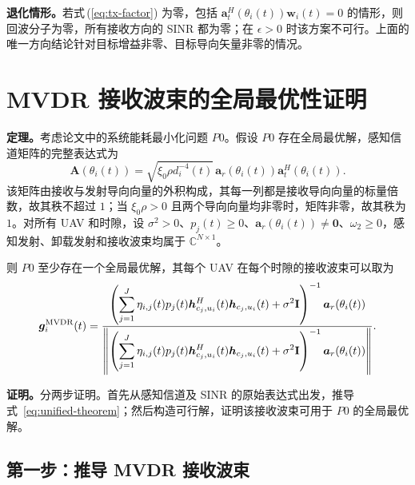 \documentclass[11pt,a4paper]{ctexart}
\begin{document}
\textbf{退化情形。}若式\,(\ref{eq:tx-factor}) 为零，包括 $\bm a_t^H(\theta_i(t))\bm w_i(t)=0$ 的情形，则回波分子为零，所有接收方向的 SINR 都为零；在 $\epsilon>0$ 时该方案不可行。上面的唯一方向结论针对目标增益非零、目标导向矢量非零的情况。

\section{MVDR 接收波束的全局最优性证明}

\noindent\textbf{定理。}考虑论文中的系统能耗最小化问题 $P0$。假设 $P0$ 存在全局最优解，感知信道矩阵的完整表达式为
\begin{equation}\label{eq:theorem-channel}
\mathbf A(\theta_i(t))=\sqrt{\xi_0\rho d_i^{-4}(t)}\,
\bm a_r(\theta_i(t))\bm a_t^H(\theta_i(t)).
\end{equation}
该矩阵由接收与发射导向向量的外积构成，其每一列都是接收导向向量的标量倍数，故其秩不超过 $1$；当 $\xi_0\rho>0$ 且两个导向向量均非零时，矩阵非零，故其秩为 $1$。对所有 UAV 和时隙，设 $\sigma^2>0$、$p_j(t)\ge0$、$\bm a_r(\theta_i(t))\ne\bm0$、$\omega_2\ge0$，感知发射、卸载发射和接收波束均属于 $\mathbb C^{N\times1}$。

则 $P0$ 至少存在一个全局最优解，其每个 UAV 在每个时隙的接收波束可以取为
\begin{equation}\label{eq:unified-theorem}
\bm g_i^{\rm MVDR}(t)=
\frac{\left(\displaystyle\sum_{j=1}^J\eta_{i,j}(t)p_j(t)
\bm h_{c_j,u_i}^{H}(t)\bm h_{c_j,u_i}(t)+\sigma^2\mathbf I\right)^{-1}
\bm a_r(\theta_i(t))}
{\left\|\left(\displaystyle\sum_{j=1}^J\eta_{i,j}(t)p_j(t)
\bm h_{c_j,u_i}^{H}(t)\bm h_{c_j,u_i}(t)+\sigma^2\mathbf I\right)^{-1}
\bm a_r(\theta_i(t))\right\|}.
\end{equation}

\medskip
\noindent\textbf{证明。}分两步证明。首先从感知信道及 SINR 的原始表达式出发，推导式~\eqref{eq:unified-theorem}；然后构造可行解，证明该接收波束可用于 $P0$ 的全局最优解。

\subsection{第一步：推导 MVDR 接收波束}
\end{document}
